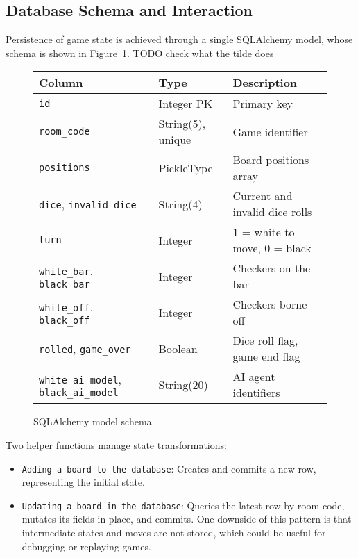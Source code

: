 \subsection{Database Schema and Interaction}
Persistence of game state is achieved through a single SQLAlchemy model, whose schema is shown in Figure~\ref{fig:game-schema}. TODO check what the tilde does

\begin{figure}[h]
\centering
\begin{tabular}{|l|l|l|}
\hline
\textbf{Column}             & \textbf{Type}          & \textbf{Description}               \\ \hline
\texttt{id}                 & Integer PK             & Primary key         \\ \hline
\texttt{room\_code}          & String(5), unique      & Game identifier                    \\ \hline
\texttt{positions}          & PickleType              & Board positions array   \\ \hline
\texttt{dice}, \texttt{invalid\_dice} & String(4)             & Current and invalid dice rolls     \\ \hline
\texttt{turn}               & Integer                & 1 = white to move, 0 = black      \\ \hline
\texttt{white\_bar}, \texttt{black\_bar} & Integer       & Checkers on the bar                \\ \hline
\texttt{white\_off}, \texttt{black\_off} & Integer      & Checkers borne off                 \\ \hline
\texttt{rolled}, \texttt{game\_over}  & Boolean        & Dice roll flag, game end flag      \\ \hline
\texttt{white\_ai\_model}, \texttt{black\_ai\_model} & String(20) & AI agent identifiers            \\ \hline
\end{tabular}
\caption{SQLAlchemy model schema}
\label{fig:game-schema}
\end{figure}

Two helper functions manage state transformations:
\begin{itemize}
\item \texttt{Adding a board to the database}: Creates and commits a new row, representing the initial state.
\item \texttt{Updating a board in the database}: Queries the latest row by room code, mutates its fields in place, and commits. One downside of this pattern is that intermediate states and moves are not stored, which could be useful for debugging or replaying games.
\end{itemize}

